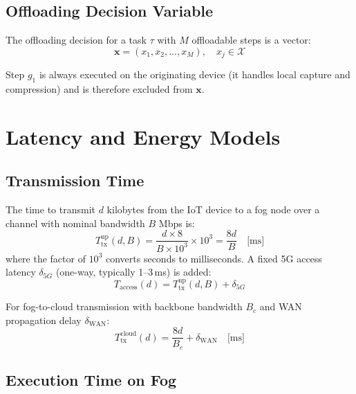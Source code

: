 \documentclass[12pt,a4paper]{article}
\theoremstyle{definition}
\theoremstyle{remark}
\begin{document}
\subsection{Offloading Decision Variable}

The offloading decision for a task $\tau$ with $M$ offloadable steps is a
vector:
\begin{equation}
  \mathbf{x} = (x_1, x_2, \ldots, x_M), \quad x_j \in \mathcal{X}
\end{equation}

Step $g_1$ is always executed on the originating device (it handles local
capture and compression) and is therefore excluded from $\mathbf{x}$.

\section{Latency and Energy Models}
\label{sec:models}

\subsection{Transmission Time}

The time to transmit $d$ kilobytes from the IoT device to a fog node over a
channel with nominal bandwidth $B$ Mbps is:
\begin{equation}
  T_{\text{tx}}^{\text{up}}(d, B) = \frac{d \times 8}{B \times 10^3} \times 10^3
  = \frac{8d}{B} \quad \text{[ms]}
  \label{eq:tx_time}
\end{equation}
where the factor of $10^3$ converts seconds to milliseconds. A fixed 5G
access latency $\delta_{5G}$ (one-way, typically 1--3\,ms) is added:
\begin{equation}
  T_{\text{access}}(d) = T_{\text{tx}}^{\text{up}}(d, B) + \delta_{5G}
\end{equation}

For fog-to-cloud transmission with backbone bandwidth $B_c$ and WAN propagation
delay $\delta_{\text{WAN}}$:
\begin{equation}
  T_{\text{tx}}^{\text{cloud}}(d) = \frac{8d}{B_c} + \delta_{\text{WAN}}
  \quad \text{[ms]}
\end{equation}

\subsection{Execution Time on Fog}
\end{document}
